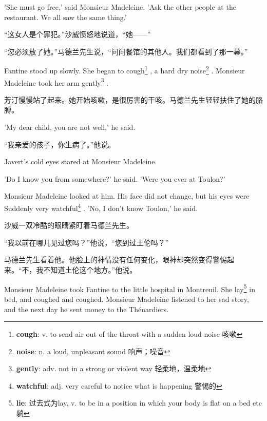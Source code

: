 \documentclass[fontset=ubuntu, zihao=5]{ctexart}
\begin{document}
\begin{paracol}{2}
  'She must go free,' said Monsieur Madeleine. 'Ask the other people at the restaurant. We all saw the same thing.'


  \switchcolumn

  “这女人是个罪犯。”沙威愤怒地说道，“她——”

  “您必须放了她。”马德兰先生说，“问问餐馆的其他人。我们都看到了那一幕。”

  \switchcolumn*

  Fantine stood up slowly. She began to cough\footnote{\textbf{cough}: v. to
    send air out of the throat with a sudden loud noise 咳嗽} , a hard dry
  noise\footnote{\textbf{noise}: n. a loud, unpleasant sound 响声；噪音}
  . Monsieur Madeleine took her arm gently\footnote{\textbf{gently}: adv. not in a strong or violent way 轻柔地，温柔地}
  .

  \switchcolumn

  芳汀慢慢站了起来。她开始咳嗽，是很厉害的干咳。马德兰先生轻轻扶住了她的胳膊。


  \switchcolumn*

  'My dear child, you are not well,' he said.

  \switchcolumn

  “我亲爱的孩子，你生病了。”他说。

  \switchcolumn*

  Javert's cold eyes stared at Monsieur Madeleine.


  'Do I know you from somewhere?' he said. 'Were you ever at Toulon?'


  Monsieur Madeleine looked at him. His face did not change, but his eyes were Suddenly very watchful\footnote{\textbf{watchful}: adj. very careful to notice what is happening 警惕的}
  . 'No, I don't know Toulon,' he said.

  \switchcolumn

  沙威一双冷酷的眼睛紧盯着马德兰先生。


  “我以前在哪儿见过您吗？”他说，“您到过土伦吗？”


  马德兰先生看着他。他脸上的神情没有任何变化，眼神却突然变得警惕起来。“不，我不知道土伦这个地方。”他说。


  \switchcolumn*

  Monsieur Madeleine took Fantine to the little hospital in Montreuil. She
  lay\footnote{\textbf{lie}: 过去式为lay, v. to be in a position in which your body is flat on a bed etc 躺}
  in bed, and coughed and coughed. Monsieur Madeleine listened to her sad story, and the next day he sent money to the Thénardiers.


\end{paracol}
\end{document}
